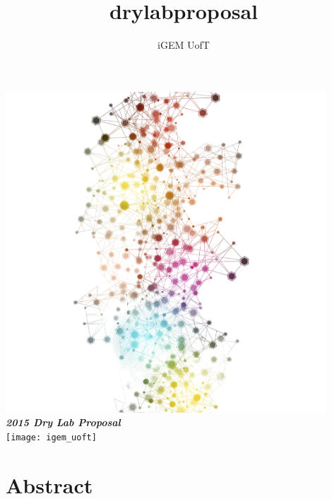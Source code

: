 

\graphicspath{ {./figures/} }

\hypersetup{
    colorlinks=true,
    linkcolor=black,
    urlcolor=cyan
}

\renewcommand*\contentsname{}



\title{drylabproposal}
\author{iGEM UofT}
\date{}


\begin{center}
    \includegraphics[width=0.9\textwidth]{global_transparent} \\
    \vspace{10pt}
    {\huge \textbf{\textit{2015 Dry Lab Proposal}}} \\
    \vspace{10pt}
    \texttt{[image: igem\_uoft]} 
\end{center}

\tableofcontents

\thispagestyle{empty}

\newpage
\setcounter{page}{1}

\section{Abstract}

